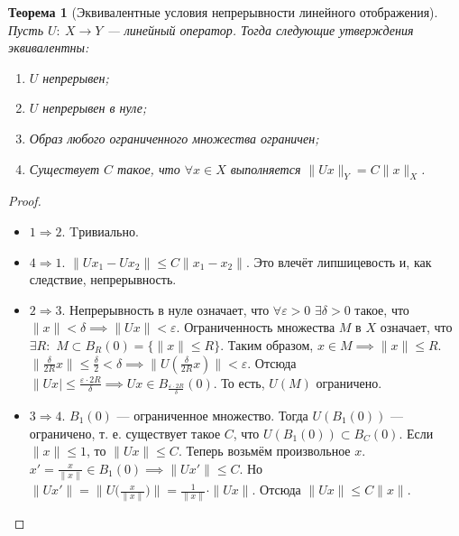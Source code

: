 \documentclass[11pt,openany,a4paper]{scrartcl}
\theoremstyle{plain}
\newtheorem{theorem}{Теорема}[subsection]
\theoremstyle{definition}
\begin{document}
\begin{theorem}[Эквивалентные условия непрерывности линейного отображения]
    Пусть $U:~X \to Y$ — линейный оператор. Тогда следующие утверждения
    эквивалентны:
    \begin{enumerate}
        \item $U$ непрерывен;
        \item $U$ непрерывен в нуле;
        \item Образ любого ограниченного множества ограничен;
        \item Существует $C$ такое, что $\forall x\in X$
        выполняется $\|Ux\|_Y = C\|x\|_X$.
    \end{enumerate}
\end{theorem}
\begin{proof}
\mbox{}
    \begin{itemize}
        \item $1 \Rightarrow 2$. Tривиально.
        \item $4 \Rightarrow 1$. $\|Ux_1 - Ux_2\| \leqslant
        C\|x_1 - x_2\|$. Это влечёт липшицевость и, как следствие, непрерывность.
        \item $2 \Rightarrow 3$. Непрерывность в нуле означает, что
        $\forall \varepsilon > 0$ $\exists \delta > 0$ такое, что
        $\|x\|<\delta \implies \|Ux\|<\varepsilon$. Ограниченность множества $M$ в $X$
        означает, что $\exists R:$ $M \subset B_R(0)=\{\|x\|\leqslant R\}$.
        Таким образом, $x\in M \implies \|x\| \leqslant R$.
        $\|\frac{\delta}{2R}x\| \leqslant \frac{\delta}{2} < \delta \implies
        \|U(\frac{\delta}{2R}x)\| < \varepsilon$. Отсюда
        $\|Ux| \leqslant \frac{\varepsilon\cdot 2R}{\delta} \implies Ux
        \in B_{\frac{\varepsilon\cdot 2R}{\delta}}(0)$. То есть, $U(M)$ ограничено.
        \item $3 \Rightarrow 4$. $B_1(0)$ — ограниченное множество. Тогда
        $U(B_1(0))$ — ограничено, т. е. существует такое $C$, что
        $U(B_1(0)) \subset B_C(0)$. Если $\|x\|\leqslant 1$, то $\|Ux\| \leqslant C$.
        Теперь возьмём произвольное $x$. $x' = \frac{x}{\|x\|} \in B_1(0) \implies
        \|Ux'\| \leqslant C$. Но $\|Ux'\| = \|U\big(\frac{x}{\|x\|}\big)\| =
        \frac{1}{\|x\|} \cdot \|Ux\|$. Отсюда $\|Ux\|\leqslant C\|x\|$.
    \end{itemize} 
\end{proof}
\end{document}
